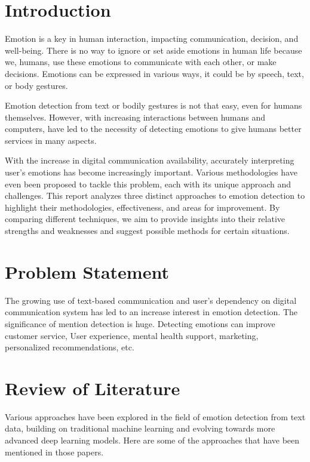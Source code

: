 \documentclass[12pt]{article} %
\begin{document}
\newpage

\tableofcontents
\newpage
\listoffigures
\newpage
\listoftables
\newpage


\section{Introduction}

Emotion is a key in human interaction, impacting communication, decision, and well-being. There is no way to ignore or set aside emotions in human life because we, humans, use these emotions to communicate with each other, or make decisions. Emotions can be expressed in various ways, it could be by speech, text, or body gestures. 

Emotion detection from text or bodily gestures is not that easy, even for humans themselves. However, with increasing interactions between humans and computers, have led to the necessity of detecting emotions to give humans better services in many aspects. 

With the increase in digital communication availability, accurately interpreting user's emotions has become increasingly important. Various methodologies have even been proposed to tackle this problem, each with its unique approach and challenges. This report analyzes three distinct approaches to emotion detection to highlight their methodologies, effectiveness, and areas for improvement. By comparing different techniques, we aim to provide insights into their relative strengths and weaknesses and suggest possible methods for certain situations.

\section{Problem Statement}

The growing use of text-based communication and user's dependency on digital communication system has led to an increase interest in emotion detection. The significance of mention detection is huge. Detecting emotions can improve customer service, User experience, mental health support, marketing, personalized recommendations, etc.

\section{Review of Literature}

Various approaches have been explored in the field of emotion detection from text data, building on traditional machine learning and evolving towards more advanced deep learning models. Here are some of the approaches that have been mentioned in those papers.
\end{document}
